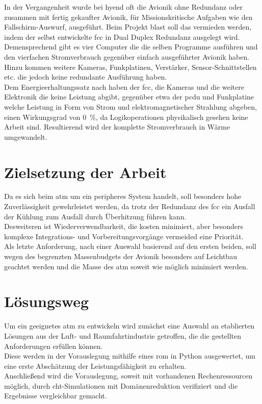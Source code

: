 In der Vergangenheit wurde bei \ac{hyend} oft die Avionik ohne Redundanz oder zusammen mit fertig gekaufter Avionik, für 
Missionskritische Aufgaben wie den Fallschirm-Auswurf, ausgeführt. Beim Projekt \ac{blast} soll das vermieden werden, 
indem der selbst entwickelte \ac{fcc} in Dual Duplex Redundanz ausgelegt wird. Demensprechend gibt es vier Computer die
die selben Programme ausführen und den vierfachen Stromverbrauch gegenüber einfach ausgeführter Avionik haben. Hinzu kommen
weitere Kameras, Funkplatinen, Verstärker, Sensor-Schnittstellen etc. die jedoch keine redundante Ausführung haben.\\

Dem Energieerhaltungssatz nach haben der \ac{fcc}, die Kameras und die weitere Elektronik die keine Leistung abgibt, gegenüber etwa
der \ac{pcdu} und Funkplatine welche Leistung in Form von Strom und elektromagnetischer Strahlung abgeben, einen Wirkungsgrad von
\SI{0}{\percent}, da Logikoperationen physikalisch gesehen keine Arbeit sind. Resultierend wird der komplette Stromverbrauch
in Wärme umgewandelt.

\section{Zielsetzung der Arbeit}

Da es sich beim \ac{atm} um ein peripheres System handelt, soll besonders hohe Zuverlässigkeit gewehrleistet werden, da trotz der
Redundanz des \ac{fcc} ein Ausfall der Kühlung zum Ausfall durch Überhitzung führen kann.\\
Desweiteren ist Wiederverwendbarkeit, die kosten minimiert, aber besonders komplexe Integrations- und Vorbereitungsvorgänge
vermeided eine Priorität.\\
Als letzte Anforderung, nach einer Auswahl basierend auf den ersten beiden, soll wegen des begrenzten Massenbudgets der Avionik
besonders auf Leichtbau geachtet werden und die Masse des \ac{atm} soweit wie möglich minimiert werden.\\

\section{Lösungsweg}

Um ein geeignetes \ac{atm} zu entwickeln wird zunächst eine Auswahl an etablierten Lösungen aus der Luft- und Raumfahrtindustrie
getroffen, die die gestellten Anforderungen erfüllen können.\\

Diese werden in der Vorauslegung mithilfe eines \ac{rom} in Python ausgewertet, um eine erste Abschätzung der Leistungsfähigkeit zu erhalten.\\
Anschließend wird die Vorauslegung, soweit mit vorhandenen Rechenressourcen möglich, durch \ac{cht}-Simulationen mit Domänenreduktion
verifiziert und die Ergebnisse vergleichbar gemacht.